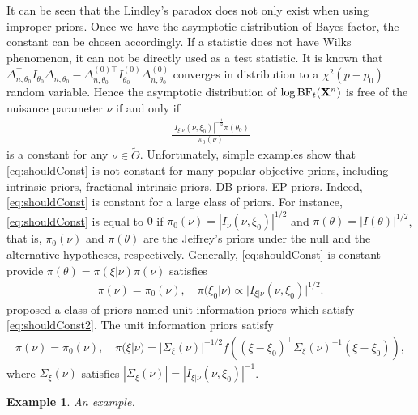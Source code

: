 \documentclass[11pt]{article}
\theoremstyle{plain}
\newtheorem{example}{Example}
\theoremstyle{definition}
\theoremstyle{remark}
\begin{document}
It can be seen that the Lindley's paradox does not only exist when using improper priors.
Once we have the asymptotic distribution of Bayes factor, the constant can be chosen accordingly.
If a statistic does not have Wilks phenomenon, it can not be directly used as a test statistic.
It is known that $
\Delta_{n,\theta_0}^\top  I_{\theta_0}\Delta_{n,\theta_0}
            -
             \Delta_{n,\theta_0}^{{(0)}\top} I^{(0)}_{\theta_0}\Delta^{(0)}_{n,\theta_0}
$ converges in distribution to a $\chi^2(p-p_0)$ random variable.
Hence the asymptotic distribution of $\log \textrm{BF}_t (\mathbf{X}^n)$ is free of the nuisance parameter $\nu$ if and only if
\begin{align}\label{eq:shouldConst}
       \frac{
           \left|I_{\xi|\nu}(\nu, \xi_0)\right|^{-\frac 1 2}\pi(\theta_0) 
   }{
    \pi_0(\nu)
}
\end{align}
is a constant for any $\nu \in \tilde \Theta$.
Unfortunately, simple examples show that \eqref{eq:shouldConst} is not constant for many popular objective priors, including intrinsic priors, fractional intrinsic priors, DB priors, EP priors.
Indeed, \eqref{eq:shouldConst} is constant for a large class of priors.
For instance, \eqref{eq:shouldConst} is equal to $0$ if $\pi_0(\nu) = |I_{\nu}(\nu, \xi_0)|^{1/2}$ and $\pi(\theta) = | I (\theta)|^{1/2}$, that is, $\pi_0(\nu)$ and $\pi(\theta)$ are the Jeffrey's priors under the null and the alternative hypotheses, respectively.
Generally, \eqref{eq:shouldConst} is constant provide $\pi(\theta) = \pi (\xi |\nu) \pi(\nu)$ satisfies
\begin{align}\label{eq:shouldConst2}
    \pi(\nu) = \pi_0 (\nu), \quad \pi(\xi_0 | \nu) \propto |I_{\xi | \nu} (\nu,\xi_0)|^{1/2}.
\end{align}
\cite{Kass1995} proposed a class of priors named unit information priors which satisfy \ref{eq:shouldConst2}.
The unit information priors satisfy
\begin{align*}
    \pi(\nu) = \pi_0 (\nu), \quad \pi(\xi | \nu) = |\Sigma_\xi(\nu)|^{-1/2} f\left((\xi - \xi_0)^\top \Sigma_\xi(\nu)^{-1} ( \xi - \xi_0)\right),
\end{align*}
where $\Sigma_{\xi}(\nu)$ satisfies
$
|\Sigma_{\xi}(\nu)|= |I_{\xi | \nu} (\nu,\xi_0)|^{-1}
$.

\begin{example}
    An example. 
\end{example}
\end{document}
